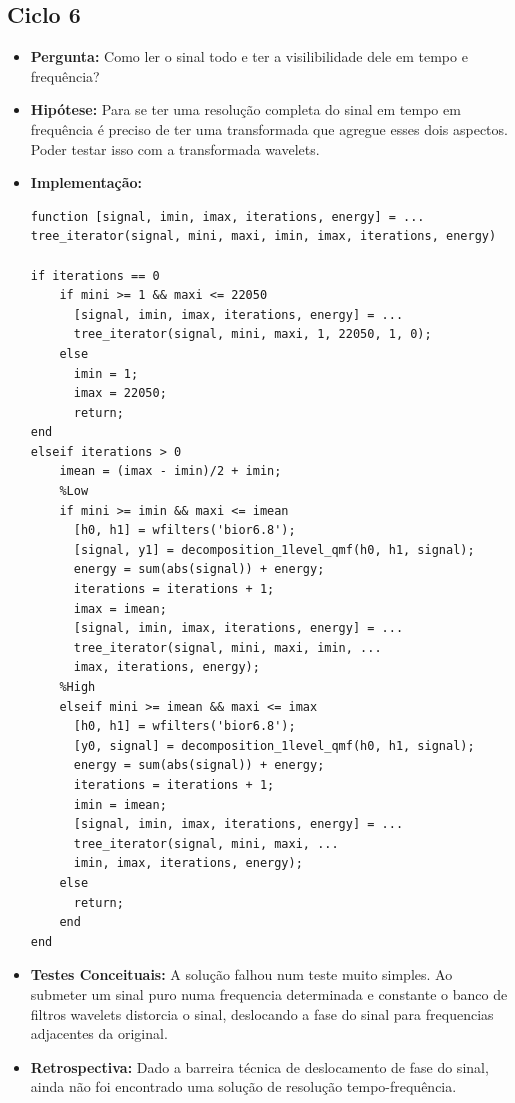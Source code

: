 \subsection{Ciclo 6}
\begin{itemize}
\item \textbf{Pergunta:} Como ler o sinal todo e ter a visilibilidade dele em tempo e frequência?
\item \textbf{Hipótese:} Para se ter uma resolução completa do sinal em tempo em frequência é preciso de ter uma transformada que agregue esses dois aspectos. Poder testar isso com a transformada wavelets.   
\item \textbf{Implementação:} 
\begin{lstlisting}
function [signal, imin, imax, iterations, energy] = ...
tree_iterator(signal, mini, maxi, imin, imax, iterations, energy)

if iterations == 0
	if mini >= 1 && maxi <= 22050
	  [signal, imin, imax, iterations, energy] = ...
	  tree_iterator(signal, mini, maxi, 1, 22050, 1, 0);
	else
	  imin = 1;
	  imax = 22050;
	  return;
end
elseif iterations > 0
	imean = (imax - imin)/2 + imin;
	%Low
	if mini >= imin && maxi <= imean
	  [h0, h1] = wfilters('bior6.8');
	  [signal, y1] = decomposition_1level_qmf(h0, h1, signal);
	  energy = sum(abs(signal)) + energy;
	  iterations = iterations + 1;
	  imax = imean;
	  [signal, imin, imax, iterations, energy] = ...
	  tree_iterator(signal, mini, maxi, imin, ...
	  imax, iterations, energy);
	%High 
	elseif mini >= imean && maxi <= imax
	  [h0, h1] = wfilters('bior6.8');
	  [y0, signal] = decomposition_1level_qmf(h0, h1, signal);
	  energy = sum(abs(signal)) + energy;
	  iterations = iterations + 1;
	  imin = imean;
	  [signal, imin, imax, iterations, energy] = ...
	  tree_iterator(signal, mini, maxi, ...
	  imin, imax, iterations, energy);
	else
	  return;
	end
end

\end{lstlisting}
\item \textbf{Testes Conceituais:} A solução falhou num teste muito simples. Ao submeter um sinal puro numa frequencia determinada e constante o banco de filtros wavelets distorcia o sinal, deslocando a fase do sinal para frequencias adjacentes da original.
\item \textbf{Retrospectiva:} Dado a barreira técnica de deslocamento de fase do sinal, ainda não foi encontrado uma solução de resolução tempo-frequência.
\end{itemize}

